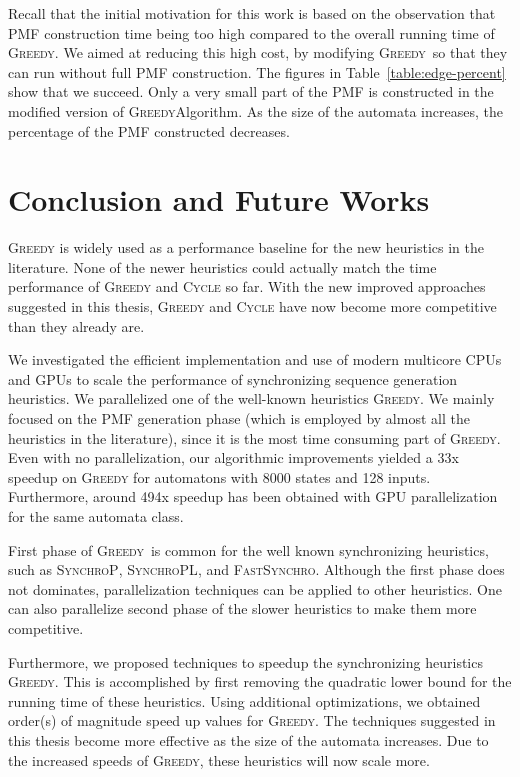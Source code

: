 \documentclass[12pt]{article}
\newcommand{\greedyAlgo}{\textsc{Greedy}}
\begin{document}
Recall that the initial motivation for this work is based on the observation that PMF construction time being too high compared to the overall running time of \greedyAlgo . We aimed at reducing this high cost, by modifying \greedyAlgo\ so that they can run without full PMF construction. The figures in Table~\ref{table:edge-percent} show that we succeed. Only a very small part of the PMF is constructed in the modified version of \greedyAlgo Algorithm. As the size of the automata increases, the percentage of the PMF constructed decreases.

\clearpage
\section{Conclusion and Future Works}
\label{sec:conclusion}

\textsc{Greedy} is widely used as a performance baseline for the new heuristics in the literature. None of the newer heuristics could actually match the time performance of \textsc{Greedy} and \textsc{Cycle} so far. With the new improved approaches suggested in this thesis, \textsc{Greedy} and \textsc{Cycle} have now become more competitive than they already are.


We investigated the efficient implementation and use of modern multicore CPUs and GPUs to scale the performance of synchronizing sequence generation heuristics. We parallelized one of the well-known heuristics \textsc{Greedy}. We mainly focused on the PMF generation phase (which is employed by almost all the heuristics in the literature), since it is the most time consuming part of \textsc{Greedy}. Even with no parallelization, our algorithmic improvements yielded a 33x speedup on \textsc{Greedy} for automatons with 8000 states and 128 inputs. Furthermore, around 494x speedup has been obtained with GPU parallelization for the same automata class.

First phase of \greedyAlgo\ is common for the well known synchronizing heuristics, such as  \textsc{SynchroP}, \textsc{SynchroPL}, and \textsc{FastSynchro}. Although the first phase does not dominates, parallelization techniques can be applied to other heuristics. One can also parallelize second phase of the  slower heuristics to make them more competitive.  

Furthermore, we proposed techniques to speedup the synchronizing heuristics \textsc{Greedy}. This is accomplished by first removing the quadratic lower bound for the running time of these heuristics. Using additional optimizations, we obtained order(s) of magnitude speed up values for \textsc{Greedy}.
The techniques suggested in this thesis become more effective as the size of the automata increases. Due to the increased speeds of \textsc{Greedy}, these heuristics will now scale more.
\end{document}
